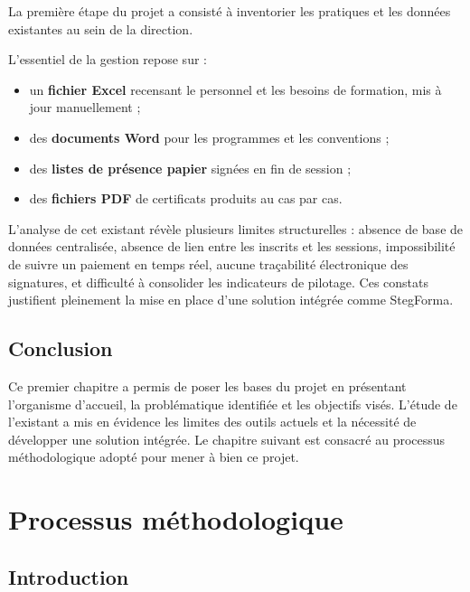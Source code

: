 \documentclass[12pt,a4paper,oneside,openany]{report}
\begin{document}
La première étape du projet a consisté à inventorier les pratiques et les données existantes au sein de la direction.

L'essentiel de la gestion repose sur :
\begin{itemize}
    \item un \textbf{fichier Excel} recensant le personnel et les besoins de formation, mis à jour manuellement ;
    \item des \textbf{documents Word} pour les programmes et les conventions ;
    \item des \textbf{listes de présence papier} signées en fin de session ;
    \item des \textbf{fichiers PDF} de certificats produits au cas par cas.
\end{itemize}

L'analyse de cet existant révèle plusieurs limites structurelles : absence de base de données centralisée, absence de lien entre les inscrits et les sessions, impossibilité de suivre un paiement en temps réel, aucune traçabilité électronique des signatures, et difficulté à consolider les indicateurs de pilotage. Ces constats justifient pleinement la mise en place d'une solution intégrée comme StegForma.

\section*{Conclusion}
\hrulefill

Ce premier chapitre a permis de poser les bases du projet en présentant l'organisme d'accueil, la problématique identifiée et les objectifs visés. L'étude de l'existant a mis en évidence les limites des outils actuels et la nécessité de développer une solution intégrée. Le chapitre suivant est consacré au processus méthodologique adopté pour mener à bien ce projet.

\chapter{Processus méthodologique}

\section*{Introduction}
\end{document}
